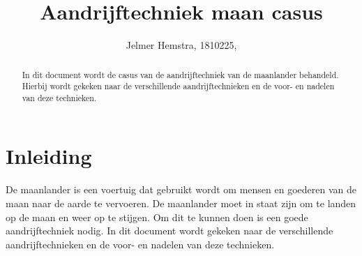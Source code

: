 \documentclass{article}
\title{Aandrijftechniek maan casus}
\author{Jelmer Hemstra, 1810225,}
\begin{document}
    \maketitle

    \begin{abstract}
        In dit document wordt de casus van de aandrijftechniek van de maanlander behandeld. Hierbij wordt gekeken naar de verschillende aandrijftechnieken en de voor- en nadelen van deze technieken.

    \end{abstract}


\section{Inleiding}
De maanlander is een voertuig dat gebruikt wordt om mensen en goederen van de maan naar de aarde te vervoeren. 
De maanlander moet in staat zijn om te landen op de maan en weer op te stijgen. 
Om dit te kunnen doen is een goede aandrijftechniek nodig. 
In dit document wordt gekeken naar de verschillende aandrijftechnieken en de voor- en nadelen van deze technieken.
\end{document}
